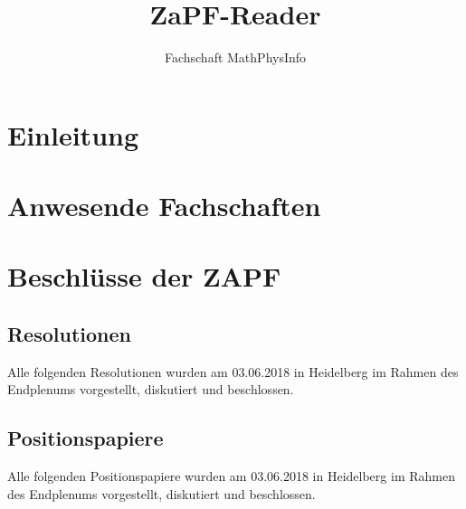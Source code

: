\documentclass[ngerman, 10pt, openany]{scrbook}
\begin{document}
\title{ZaPF-Reader}
\author{Fachschaft MathPhysInfo}
\maketitle


\newpage
\setcounter{tocdepth}{1} %
\normalsize

\dominitoc
\tableofcontents

\emptychapter

\chapter{Einleitung}
  

\chapter{Anwesende Fachschaften}
  

\tocchapter

\chapter{Beschlüsse der ZAPF}
  \section{Resolutionen}
    Alle folgenden Resolutionen wurden am 03.06.2018 in Heidelberg im Rahmen des Endplenums
    vorgestellt, diskutiert und beschlossen.
      
      
      
      
      
      
      
      
      

  \section{Positionspapiere}
    Alle folgenden Positionspapiere wurden am 03.06.2018 in Heidelberg im Rahmen des Endplenums
    vorgestellt, diskutiert und beschlossen.
      
      
      
\end{document}
